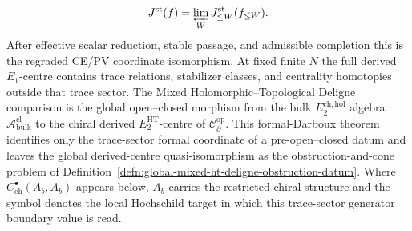 \documentclass[11pt]{memoir}
\begin{document}
\[
  J^{\mathrm{st}}(f)=\varprojlim_W J^{\mathrm{st}}_{\leq W}(f_{\leq W}).
\]
After effective scalar reduction, stable passage, and admissible
completion this is the regraded CE/PV coordinate isomorphism.  At fixed finite
\(N\) the full derived \(E_1\)-centre contains trace relations,
stabilizer classes, and centrality homotopies outside that trace
sector.  The Mixed Holomorphic--Topological Deligne comparison is the
global open--closed morphism from the bulk
\(E_2^{\mathrm{ch,hol}}\) algebra
\(\mathcal A^{\mathrm{cl}}_{\mathrm{bulk}}\) to the chiral derived
\(E_2^{\mathrm{HT}}\)-centre of
\(\mathcal C^{\mathrm{op}}_\partial\).  This
formal-Darboux theorem identifies only the trace-sector formal
coordinate of a pre-open--closed datum and leaves the global derived-centre
quasi-isomorphism as the obstruction-and-cone problem of
Definition~\ref{defn:global-mixed-ht-deligne-obstruction-datum}.  Where
\(C^\bullet_{\mathrm{ch}}(A_b,A_b)\) appears below, \(A_b\) carries
the restricted chiral structure and the symbol denotes the local
Hochschild target in which this trace-sector generator boundary value
is read.
\end{document}
